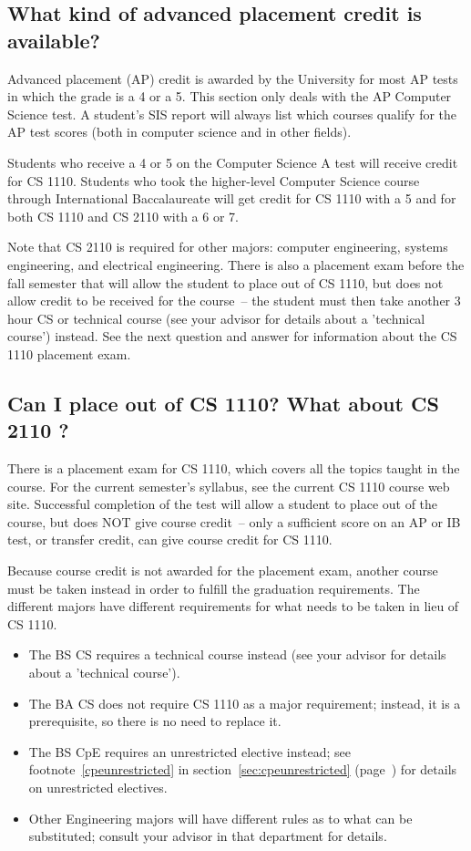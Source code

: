 \documentclass[10pt,letter,twocolumn]{book}
\newenvironment{itemlist}{
\begin{itemize}
\setlength{\itemsep}{0pt}
\setlength{\parskip}{0pt}}
{\end{itemize}}
\begin{document}
\subsection{What kind of advanced placement credit is available?}
\label{applacement}

Advanced placement (AP) credit is awarded by the University for most
AP tests in which the grade is a 4 or a 5. This section only deals
with the AP Computer Science test. A student's SIS report will
always list which courses qualify for the AP test scores (both in
computer science and in other fields).

Students who receive a 4 or 5 on the Computer Science A test will
receive credit for CS 1110.  Students who took the higher-level Computer
Science course through International Baccalaureate will get credit for
CS 1110 with a 5 and for both CS 1110 and CS 2110 with a 6 or 7.

Note that CS 2110 is required for other majors: computer engineering,
systems engineering, and electrical engineering. There is also a
placement exam before the fall semester that will allow the student to
place out of CS 1110, but does not allow credit to be received for the
course~-- the student must then take another 3 hour CS or technical
course (see your advisor for details about a 'technical course')
instead. See the next question and answer for information about the CS
1110 placement exam.

\subsection{Can I place out of CS 1110? What about CS 2110 ?}
\label{101placement}

There is a placement exam for CS 1110, which covers all the topics
taught in the course. For the current semester's syllabus, see the
current CS 1110 course web site. Successful completion of the test
will allow a student to place out of the course, but does NOT give
course credit~-- only a sufficient score on an AP or IB test, or
transfer credit, can give course credit for CS 1110.

Because course credit is not awarded for the placement exam, another
course must be taken instead in order to fulfill the graduation
requirements.  The different majors have different requirements for
what needs to be taken in lieu of CS 1110.

\begin{itemlist}
\item The BS CS requires a technical course instead (see your advisor
for details about a 'technical course').
\item The BA CS does not require CS 1110 as a major requirement;
  instead, it is a prerequisite, so there is no need to replace it.
\item The BS CpE requires an unrestricted elective instead; see
footnote~\ref{cpeunrestricted} in section~\ref{sec:cpeunrestricted}
(page~\pageref{cpeunrestricted}) for details on unrestricted
electives.
\item Other Engineering majors will have different rules as to what
  can be substituted; consult your advisor in that department for
  details.
\end{itemlist}
\end{document}
